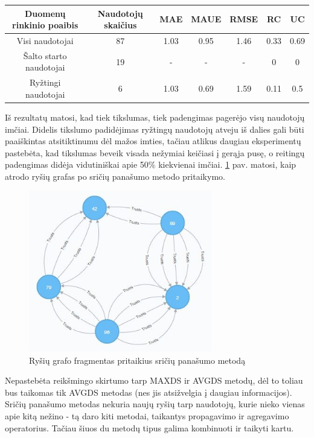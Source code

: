 \documentclass{VUMIFInfMagistrinis}
\begin{document}
\begin{center}
	\begin{tabular}{||c c c c c c c ||} 
		Duomenų rinkinio poaibis & Naudotojų skaičius & MAE & MAUE & RMSE & RC & UC \\
		\hline
		Visi naudotojai & 87 & 1.03 & 0.95 & 1.46 & 0.33 & 0.69 \\
		\hline
		Šalto starto naudotojai & 19 & - & - & - & 0 & 0 \\
		\hline
		Ryžtingi naudotojai & 6 & 1.03 & 0.69 & 1.59 & 0.11 & 0.5 \\
	\end{tabular}
\end{center}
\indent
Iš rezultatų matosi, kad tiek tikslumas, tiek padengimas pagerėjo visų naudotojų imčiai. Didelis tikslumo padidėjimas ryžtingų naudotojų atveju  iš dalies gali būti paaiškintas atsitiktinumu dėl mažos imties, tačiau atlikus daugiau eksperimentų pastebėta, kad tikslumas beveik visada nežymiai keičiasi į gerąja pusę, o reitingų padengimas didėja vidutiniškai apie 50\% kiekvienai imčiai.  \ref{BASEDS} pav. matosi, kaip atrodo ryšių grafas po sričių panašumo metodo pritaikymo.
\begin{figure}[ht!]
	\centering
	\includegraphics[width=80mm]{BASEDS.jpg}
	\caption{Ryšių grafo fragmentas pritaikius sričių panašumo metodą} \label{BASEDS}
\end{figure}
\newline
\indent
Nepastebėta reikšmingo skirtumo tarp MAXDS ir AVGDS metodų, dėl to toliau  bus taikomas tik AVGDS metodas (nes jis atsižvelgia į daugiau informacijos).
\indent  Sričių panašumo metodas nekuria naujų ryšių tarp naudotojų, kurie nieko vienas apie kitą nežino - tą daro kiti metodai, taikantys propagavimo ir agregavimo operatorius. Tačiau šiuos du metodų tipus galima kombinuoti ir taikyti kartu.
\end{document}
